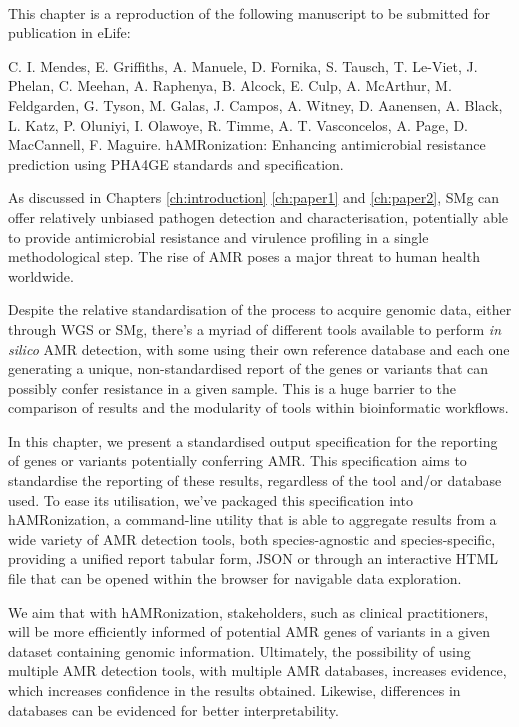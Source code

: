 \mbox{}\\
\vspace{8cm}


This chapter is a reproduction of the following manuscript to be submitted for publication in eLife:

C. I. Mendes, E. Griffiths, A. Manuele, D. Fornika, S. Tausch, T. Le-Viet, J. Phelan, C. Meehan, A. Raphenya, B. Alcock, E. Culp, A. McArthur, M. Feldgarden, G. Tyson, M. Galas, J. Campos, A. Witney, D. Aanensen, A. Black, L. Katz, P. Oluniyi, I. Olawoye, R. Timme, A. T. Vasconcelos, A. Page, D. MacCannell, F. Maguire. 
hAMRonization: Enhancing antimicrobial resistance prediction using PHA4GE standards and specification. 

As discussed in Chapters \ref{ch:introduction} \ref{ch:paper1} and \ref{ch:paper2}, \ac{SMg} can offer relatively unbiased pathogen detection and characterisation, potentially able to provide antimicrobial resistance and virulence profiling in a single methodological step. The rise of \ac{AMR} poses a major threat to human health worldwide.

Despite the relative standardisation of the process to acquire genomic data, either through \ac{WGS} or \ac{SMg}, there's a myriad of different tools available to perform \textit{in silico} \ac{AMR} detection, with some using their own reference database and each one generating a unique, non-standardised report of the genes or variants that can possibly confer resistance in a given sample. This is a huge barrier to the comparison
of results and the modularity of tools within bioinformatic workflows.

In this chapter, we present a standardised output specification for the reporting of genes or variants potentially conferring \ac{AMR}. This specification aims to standardise the reporting of these results, regardless of the tool and/or database used. To ease its utilisation, we've packaged this specification into hAMRonization, a command-line utility that is able to aggregate results from a wide variety of \ac{AMR} detection tools, both species-agnostic and species-specific, providing a unified report tabular form, JSON or through an interactive HTML file that can be opened within the browser for navigable data exploration. 

We aim that with hAMRonization, stakeholders, such as clinical practitioners, will be more efficiently informed of potential \ac{AMR} genes of variants in a given dataset containing genomic information. Ultimately, the possibility of using multiple \ac{AMR} detection tools, with multiple \ac{AMR} databases, increases evidence, which increases confidence in the results obtained. Likewise, differences in databases can be evidenced for better interpretability. 

